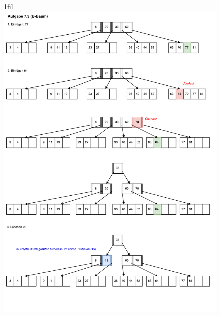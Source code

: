 \documentclass[11pt, a4paper]{article}
\makeatletter
\newcommand*{\centerfloat}{%
  \parindent \z@
  \leftskip \z@ \@plus 1fil \@minus \textwidth
  \rightskip\leftskip
  \parfillskip \z@skip}
\makeatother
\begin{document}
\begin{figure}[h]
\centerfloat
\includegraphics[page=1,scale=0.9]{DBIS7_3.pdf}
\end{figure}
\end{document}
